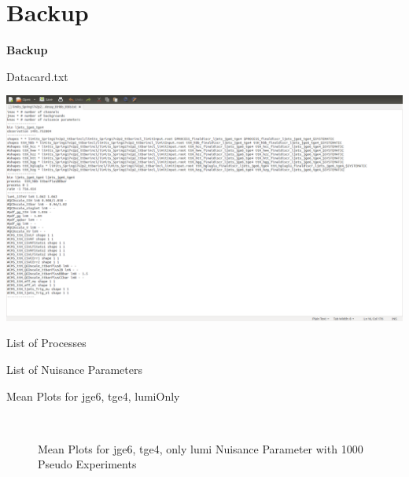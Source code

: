 \section{Backup}
\begin{frame}
	\begin{center}
		\textbf{\Huge Backup}
	\end{center}
\end{frame}

\begin{frame}{Datacard.txt}

\includegraphics[width = \textwidth]{datacard.png}

\end{frame}



\begin{frame}{List of Processes}

\end{frame}

\begin{frame}{List of Nuisance Parameters}

\end{frame}

\begin{frame}{Mean Plots for jge6, tge4, lumiOnly}

\begin{figure}
\centering
{} $\qquad$
\scriptsize\caption[jge6$\_$tge4$\_$N1000$\_$lumiOnly]{Mean Plots for jge6, tge4, only lumi Nuisance Parameter with 1000 Pseudo Experiments}
\end{figure}

\end{frame}

